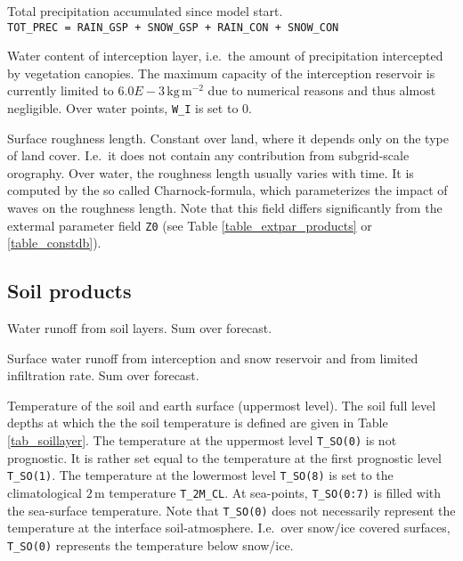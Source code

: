 \begin{description}[leftmargin=3.0cm,style=sameline]
 \item [TOT\_PREC] Total precipitation accumulated since model start.\\
                \texttt{TOT\_PREC = RAIN\_GSP + SNOW\_GSP + RAIN\_CON + SNOW\_CON}
                
 \item [W\_I]   Water content of interception layer, i.e.\ the amount of precipitation intercepted by vegetation canopies. The maximum 
                capacity of the interception reservoir is currently limited to $6.0E-3\,\mathrm{kg\,m^{-2}}$ due to numerical reasons 
                and thus almost negligible. Over water points, \texttt{W\_I} is set to 0.

 \item [Z0]     Surface roughness length. Constant over land, where it depends only on the type of land cover. I.e.\ it does 
                not contain any contribution from subgrid-scale orography. Over water, the roughness length usually varies 
                with time. It is computed by the so called Charnock-formula, which parameterizes the impact of waves on the 
                roughness length. Note that this field differs significantly from the extermal parameter field \texttt{Z0} 
                (see Table \ref{table_extpar_products} or \ref{table_constdb}).  
\end{description}


\subsection{Soil products}
\begin{description}[leftmargin=3.0cm,style=sameline]
 \item [RUNOFF\_G] Water runoff from soil layers. Sum over forecast.

 \item [RUNOFF\_S] Surface water runoff from interception and snow reservoir and from limited infiltration rate. Sum over forecast.

 \item [T\_SO] Temperature of the soil and earth surface (uppermost level). The soil full level depths at which the 
               the soil temperature is defined are given in Table \ref{tab_soillayer}. The temperature at the uppermost 
               level \texttt{T\_SO(0)} is not prognostic. It is rather set equal to the temperature at the first prognostic 
               level \texttt{T\_SO(1)}. The temperature at the lowermost level \texttt{T\_SO(8)} is set to the climatological 
               $2\,\mathrm{m}$ temperature \texttt{T\_2M\_CL}. At sea-points, \texttt{T\_SO(0:7)} is filled with the sea-surface 
               temperature. Note that \texttt{T\_SO(0)} does not necessarily represent the temperature at the interface soil-atmosphere. 
               I.e.\ over snow/ice covered surfaces, \texttt{T\_SO(0)} represents the temperature below snow/ice.
\end{description}


